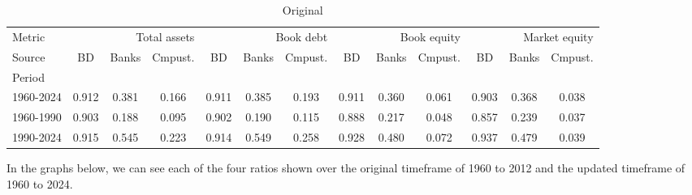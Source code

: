 \documentclass{article}
\begin{document}
    \begin{table}[htbp]
      \centering
      \caption{Original}
      \label{tab:Table 2}
      \small
      \begin{tabular}{lcccccccccccc}
\toprule
Metric & \multicolumn{3}{r}{Total assets} & \multicolumn{3}{r}{Book debt} & \multicolumn{3}{r}{Book equity} & \multicolumn{3}{r}{Market equity} \\
Source & BD & Banks & Cmpust. & BD & Banks & Cmpust. & BD & Banks & Cmpust. & BD & Banks & Cmpust. \\
Period &  &  &  &  &  &  &  &  &  &  &  &  \\
\midrule
1960-2024 & 0.912 & 0.381 & 0.166 & 0.911 & 0.385 & 0.193 & 0.911 & 0.360 & 0.061 & 0.903 & 0.368 & 0.038 \\
1960-1990 & 0.903 & 0.188 & 0.095 & 0.902 & 0.190 & 0.115 & 0.888 & 0.217 & 0.048 & 0.857 & 0.239 & 0.037 \\
1990-2024 & 0.915 & 0.545 & 0.223 & 0.914 & 0.549 & 0.258 & 0.928 & 0.480 & 0.072 & 0.937 & 0.479 & 0.039 \\
\bottomrule
\end{tabular}

    \end{table}
    
\par
In the graphs below, we can see each of the four ratios shown over the original timeframe of 1960 to 2012 and the updated timeframe of 1960 to 2024.\par
\end{document}
